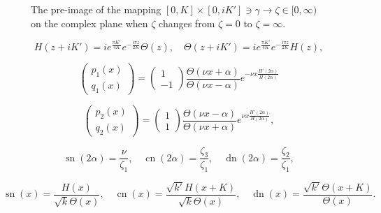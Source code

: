 \documentclass[10pt,a4paper]{amsart}
\DeclareMathOperator{\cn}{cn}
\DeclareMathOperator{\dn}{dn}
\DeclareMathOperator{\sn}{sn}
\begin{document}
\begin{figure}[htb!]
	
	\caption{The pre-image of the mapping $[0,K]  \times [0,iK'] \ni \gamma \to \zeta \in [0,\infty)$ on the complex plane when $\zeta$ changes from $\zeta = 0$ to $\zeta = \infty$.}
	\label{fig-image}
\end{figure}

	\begin{equation}
	\label{Wei-Jac-3}
	H(z+iK') = i e^{\frac{\pi K'}{4 K}} e^{-\frac{i \pi z}{2K}} \Theta(z), \quad 
	\Theta(z+iK') = i e^{\frac{\pi K'}{4 K}} e^{-\frac{i \pi z}{2K}} H(z),
	\end{equation}

	\begin{equation}
	\label{exact-2}
	\left( \begin{matrix} p_1(x) \\ q_1(x) \end{matrix} \right) = 
	\left( \begin{matrix} 1 \\ -1 \end{matrix} \right) \frac{\Theta(\nu x + \alpha)}{\Theta(\nu x - \alpha)} e^{-\nu x \frac{H'(2\alpha)}{H(2\alpha)}}
	\end{equation}

	\begin{equation}
	\label{exact-1}
	\left( \begin{matrix} p_2(x) \\ q_2(x) \end{matrix} \right) = 
	\left( \begin{matrix} 1 \\ 1 \end{matrix} \right) \frac{\Theta(\nu x - \alpha)}{\Theta(\nu x + \alpha)} 
	e^{\nu x \frac{H'(2\alpha)}{H(2\alpha)}},
	\end{equation}

	\begin{equation}
	\label{elliptic-double-alpha}
	\sn(2\alpha) = \frac{\nu}{\zeta_1}, \quad \cn(2\alpha) = \frac{\zeta_3}{\zeta_1}, \quad \dn(2\alpha) = \frac{\zeta_2}{\zeta_1},
	\end{equation}

\begin{equation}
\label{Jacobi-sn}
\sn(x) = \frac{H(x)}{\sqrt{k} \Theta(x)}, \quad \cn(x) =  \frac{\sqrt{k'} H(x+K)}{\sqrt{k} \Theta(x)}, \quad \dn(x) = \frac{\sqrt{k'} \Theta(x + K)}{\Theta(x)}.
\end{equation}
\end{document}
